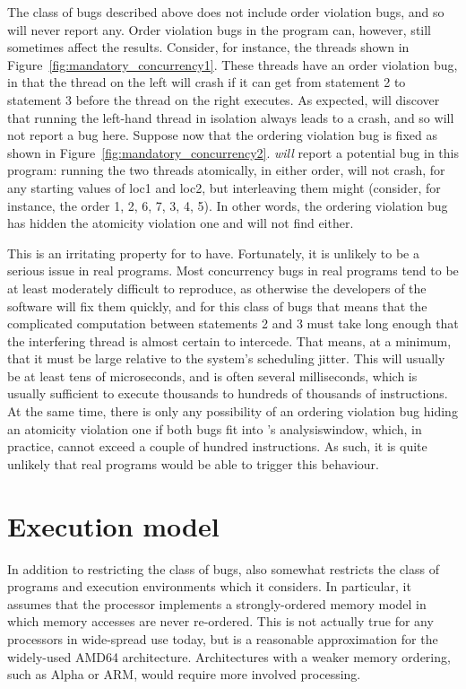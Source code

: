 The class of bugs described above does not include order violation
bugs, and so {\technique} will never report any.  Order violation bugs
in the program can, however, still sometimes affect the results.
Consider, for instance, the threads shown in
Figure~\ref{fig:mandatory_concurrency1}.  These threads have an order
violation bug, in that the thread on the left will crash if it can get
from statement 2 to statement 3 before the thread on the right
executes.  As expected, {\technique} will discover that running the
left-hand thread in isolation always leads to a crash, and so will not
report a bug here.  Suppose now that the ordering violation bug is
fixed as shown in Figure~\ref{fig:mandatory_concurrency2}.
{\Technique} \emph{will} report a potential bug in this program:
running the two threads atomically, in either order, will not crash,
for any starting values of loc1 and loc2, but interleaving them might
(consider, for instance, the order 1, 2, 6, 7, 3, 4, 5).  In other
words, the ordering violation bug has hidden the atomicity violation
one and {\technique} will not find either.

This is an irritating property for {\technique} to have.  Fortunately,
it is unlikely to be a serious issue in real programs.  Most
concurrency bugs in real programs tend to be at least moderately
difficult to reproduce, as otherwise the developers of the software
will fix them quickly, and for this class of bugs that means that the
complicated computation between statements 2 and 3 must take long
enough that the interfering thread is almost certain to intercede.
That means, at a minimum, that it must be large relative to the
system's scheduling jitter.  This will usually be at least tens of
microseconds, and is often several milliseconds, which is usually
sufficient to execute thousands to hundreds of thousands of
instructions.  At the same time, there is only any possibility of an
ordering violation bug hiding an atomicity violation one if both bugs
fit into {\technique}'s \gls{analysiswindow}, which, in practice,
cannot exceed a couple of hundred instructions.  As such, it is quite
unlikely that real programs would be able to trigger this behaviour.

\section{Execution model}

In addition to restricting the class of bugs, {\technique} also
somewhat restricts the class of programs and execution environments
which it considers.  In particular, it assumes that the processor
implements a strongly-ordered memory model in which memory accesses
are never re-ordered.  This is not actually true for any processors in
wide-spread use today, but is a reasonable approximation for the
widely-used AMD64 architecture\needCite{}.  Architectures with a
weaker memory ordering, such as Alpha\needCite{} or ARM\needCite{},
would require more involved processing.

